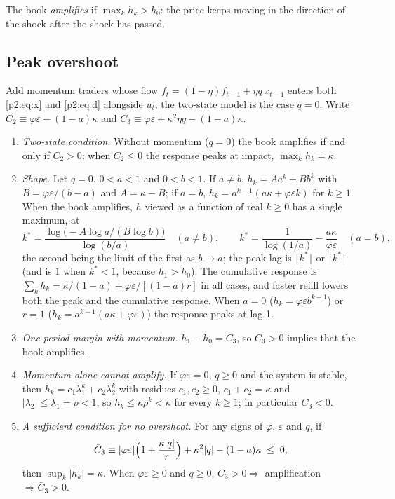 \begin{definition}
The book \emph{amplifies} if $\max_kh_k>h_0$: the price keeps moving in the direction of the shock after the shock has passed.
\end{definition}

\subsection{Peak overshoot}

Add momentum traders whose flow $f_t=(1-\eta)f_{t-1}+\eta q\,x_{t-1}$ enters both \eqref{p2:eq:x} and \eqref{p2:eq:d} alongside $u_t$; the two-state model is the case $q=0$. Write $C_2\equiv\varphi\varepsilon-(1-a)\kappa$ and $C_3\equiv\varphi\varepsilon+\kappa^2\eta q-(1-a)\kappa$.

\begin{theorem}\label{p2:thm:peak}
\begin{enumerate}[label=(\roman*)]
\item\label{p2:thm:t6} \emph{Two-state condition.} Without momentum ($q=0$) the book amplifies if and only if $C_2>0$; when $C_2\le0$ the response peaks at impact, $\max_kh_k=\kappa$.
\item\label{p2:prop:shape} \emph{Shape.} Let $q=0$, $0<a<1$ and $0<b<1$. If $a\neq b$, $h_k=Aa^k+Bb^k$ with $B=\varphi\varepsilon/(b-a)$ and $A=\kappa-B$; if $a=b$, $h_k=a^{k-1}(a\kappa+\varphi\varepsilon k)$ for $k\ge1$. When the book amplifies, $h$ viewed as a function of real $k\ge0$ has a single maximum, at
\[
k^*=\frac{\log\bigl(-A\log a/(B\log b)\bigr)}{\log(b/a)}\quad(a\neq b),\qquad k^*=\frac1{\log(1/a)}-\frac{a\kappa}{\varphi\varepsilon}\quad(a=b),
\]
the second being the limit of the first as $b\to a$; the peak lag is $\lfloor k^*\rfloor$ or $\lceil k^*\rceil$ (and is $1$ when $k^*<1$, because $h_1>h_0$). The cumulative response is $\sum_kh_k=\kappa/(1-a)+\varphi\varepsilon/[(1-a)r]$ in all cases, and faster refill lowers both the peak and the cumulative response. When $a=0$ ($h_k=\varphi\varepsilon b^{k-1}$) or $r=1$ ($h_k=a^{k-1}(a\kappa+\varphi\varepsilon)$) the response peaks at lag 1.
\item\label{p2:prop:t6m} \emph{One-period margin with momentum.} $h_1-h_0=C_3$, so $C_3>0$ implies that the book amplifies.
\item\label{p2:thm:nomom} \emph{Momentum alone cannot amplify.} If $\varphi\varepsilon=0$, $q\ge0$ and the system is stable, then $h_k=c_1\lambda_1^k+c_2\lambda_2^k$ with residues $c_1,c_2\ge0$, $c_1+c_2=\kappa$ and $|\lambda_2|\le\lambda_1=\rho<1$, so $h_k\le\kappa\rho^k<\kappa$ for every $k\ge1$; in particular $C_3<0$.
\item\label{p2:thm:noover} \emph{A sufficient condition for no overshoot.} For any signs of $\varphi$, $\varepsilon$ and $q$, if
\[
\bar C_3\equiv|\varphi\varepsilon|\Bigl(1+\frac{\kappa|q|}{r}\Bigr)+\kappa^2|q|-(1-a)\kappa\;\le\;0,
\]
then $\sup_k|h_k|=\kappa$. When $\varphi\varepsilon\ge0$ and $q\ge0$, $C_3>0\Rightarrow$ amplification $\Rightarrow\bar C_3>0$.
\end{enumerate}
\end{theorem}

